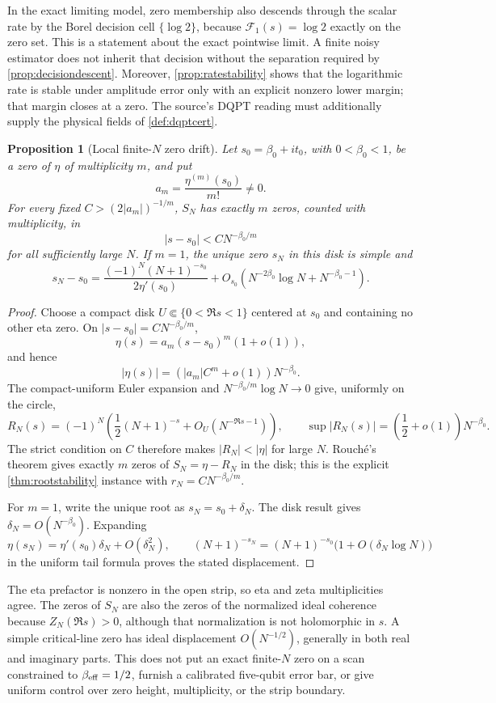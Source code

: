\documentclass[11pt,a4paper]{article}
\theoremstyle{definition}
\theoremstyle{plain}
\newtheorem{proposition}[definition]{Proposition}
\theoremstyle{remark}
\begin{document}
In the exact limiting model, zero membership also descends through the scalar
rate by the Borel decision cell \(\{\log2\}\), because
\(\mathcal F_1(s)=\log2\) exactly on the zero set.  This is a statement about
the exact pointwise limit.  A finite noisy estimator does not inherit that
decision without the separation required by
\cref{prop:decisiondescent}.  Moreover, \cref{prop:ratestability} shows that
the logarithmic rate is stable under amplitude error only with an explicit
nonzero lower margin; that margin closes at a zero.  The source's DQPT reading
must additionally supply the physical fields of \cref{def:dqptcert}.

\begin{proposition}[Local finite-\(N\) zero drift]\label{prop:eta-zero-drift}
Let \(s_0=\beta_0+it_0\), with \(0<\beta_0<1\), be a zero of \(\eta\) of
multiplicity \(m\), and put
\[
 a_m=\frac{\eta^{(m)}(s_0)}{m!}\ne0.
\]
For every fixed \(C>(2|a_m|)^{-1/m}\), \(S_N\) has exactly \(m\) zeros,
counted with multiplicity, in
\[
 |s-s_0|<C N^{-\beta_0/m}
\]
for all sufficiently large \(N\).  If \(m=1\), the unique zero \(s_N\) in
this disk is simple and
\[
 s_N-s_0
 =
 \frac{(-1)^N(N+1)^{-s_0}}{2\eta'(s_0)}
 +O_{s_0}\!\left(
   N^{-2\beta_0}\log N+N^{-\beta_0-1}
 \right).
\]
\end{proposition}
\begin{proof}
Choose a compact disk \(U\Subset\{0<\Re s<1\}\) centered at \(s_0\) and
containing no other eta zero.  On
\(|s-s_0|=C N^{-\beta_0/m}\),
\[
 \eta(s)=a_m(s-s_0)^m(1+o(1)),
\]
and hence
\[
 |\eta(s)|=(|a_m|C^m+o(1))N^{-\beta_0}.
\]
The compact-uniform Euler expansion and
\(N^{-\beta_0/m}\log N\to0\) give, uniformly on the circle,
\[
 R_N(s)=(-1)^N\left(
  \frac12(N+1)^{-s}+O_U(N^{-\Re s-1})
 \right),
 \qquad
 \sup |R_N(s)|=
 \left(\frac12+o(1)\right)N^{-\beta_0}.
\]
The strict condition on \(C\) therefore makes \(|R_N|<|\eta|\) for large
\(N\).  Rouch\'e's theorem gives exactly \(m\) zeros of
\(S_N=\eta-R_N\) in the disk; this is the explicit
\cref{thm:rootstability} instance with
\(r_N=C N^{-\beta_0/m}\).

For \(m=1\), write the unique root as \(s_N=s_0+\delta_N\).  The disk result
gives \(\delta_N=O(N^{-\beta_0})\).  Expanding
\[
 \eta(s_N)=\eta'(s_0)\delta_N+O(\delta_N^2),\qquad
 (N+1)^{-s_N}
 =(N+1)^{-s_0}\bigl(1+O(\delta_N\log N)\bigr)
\]
in the uniform tail formula proves the stated displacement.
\end{proof}
The eta prefactor is nonzero in the open strip, so eta and zeta
multiplicities agree.  The zeros of \(S_N\) are also the zeros of the
normalized ideal coherence because \(Z_N(\Re s)>0\), although that
normalization is not holomorphic in \(s\).  A simple critical-line zero has
ideal displacement \(O(N^{-1/2})\), generally in both real and imaginary
parts.  This does not put an exact finite-\(N\) zero on a scan constrained to
\(\beta_{\rm eff}=1/2\), furnish a calibrated five-qubit error bar, or give
uniform control over zero height, multiplicity, or the strip boundary.
\end{document}

